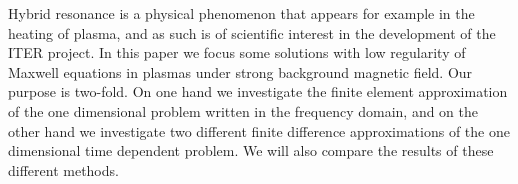 Hybrid resonance is a physical phenomenon
that appears for example in the heating of plasma,
and as such is of scientific interest in the development  of  the ITER project.
In this paper we focus some solutions with low regularity of Maxwell equations in
plasmas under strong background magnetic field.
Our purpose is two-fold.
On one hand we investigate the finite element approximation of the one dimensional problem 
written in the frequency domain, and on the other hand we investigate two different 
finite difference approximations of the one dimensional time dependent problem.
We will also compare the results of these different methods.